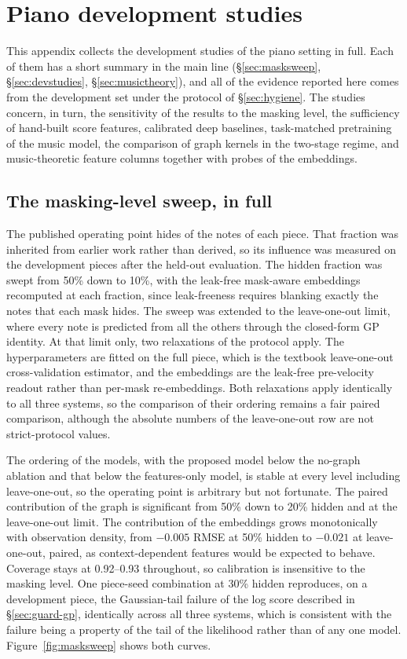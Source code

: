 \chapter{Piano development studies}\label{app:phase1dev}
This appendix collects the development studies of the piano setting in
full. Each of them has a short summary in the main line
(\S\ref{sec:masksweep}, \S\ref{sec:devstudies}, \S\ref{sec:musictheory}),
and all of the evidence reported here comes from the development set under
the protocol of \S\ref{sec:hygiene}. The studies concern, in turn, the
sensitivity of the results to the masking level, the sufficiency of
hand-built score features, calibrated deep baselines, task-matched
pretraining of the music model, the comparison of graph kernels in the
two-stage regime, and music-theoretic feature columns together with probes
of the embeddings.

\section{The masking-level sweep, in full}\label{app:masksweep}
The published operating point hides \maskRate{} of the notes of each piece.
That fraction was inherited from earlier work rather than derived, so its
influence was measured on the development pieces after the held-out
evaluation. The hidden fraction was swept from 50\% down to 10\%, with the
leak-free mask-aware embeddings recomputed at each fraction, since
leak-freeness requires blanking exactly the notes that each mask hides. The
sweep was extended to the leave-one-out limit, where every note is predicted
from all the others through the closed-form GP identity. At that limit only,
two relaxations of the protocol apply. The hyperparameters are fitted on the
full piece, which is the textbook leave-one-out cross-validation estimator,
and the embeddings are the leak-free pre-velocity readout rather than
per-mask re-embeddings. Both relaxations apply identically to all three
systems, so the comparison of their ordering remains a fair paired
comparison, although the absolute numbers of the leave-one-out row are not
strict-protocol values.

The ordering of the models, with the proposed model below the no-graph
ablation and that below the features-only model, is stable at every level
including leave-one-out, so the operating point is arbitrary but not
fortunate. The paired contribution of the graph is significant from 50\%
down to 20\% hidden and at the leave-one-out limit. The contribution of the
embeddings grows monotonically with observation density, from $-0.005$ RMSE
at 50\% hidden to $-0.021$ at leave-one-out, paired, as context-dependent
features would be expected to behave. Coverage stays at 0.92--0.93
throughout, so calibration is insensitive to the masking level. One
piece-seed combination at 30\% hidden reproduces, on a development piece,
the Gaussian-tail failure of the log score described in
\S\ref{sec:guard-gp}, identically across all three systems, which is
consistent with the failure being a property of the tail of the likelihood
rather than of any one model. Figure~\ref{fig:masksweep} shows both curves.

